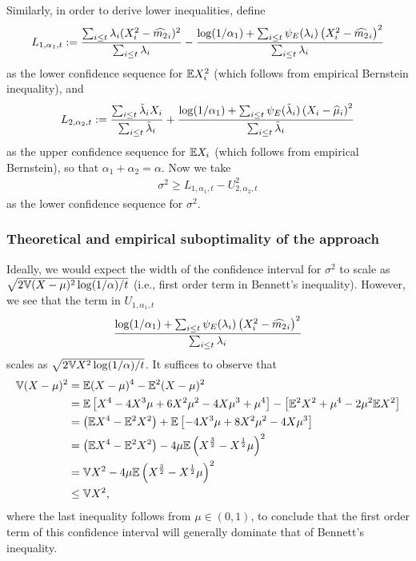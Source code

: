 Similarly, in order to derive lower inequalities, define
\begin{align*}
    L_{1, \alpha_1, t} :=  \frac{\sum_{i \leq t}\lambda_i (X_i^2 - \widehat {m_2}_i)^2}{\sum_{i \leq t} \lambda_i} - \frac{\log(1/\alpha_1) + \sum_{i \leq t}\psi_E(\lambda_i) \left( X_i ^2 - \widehat {m_2}_i \right)^2}{\sum_{i \leq t} \lambda_i} 
\end{align*}
as the lower confidence sequence for $\mathbb{E} X_i^2$ (which follows from empirical Bernstein inequality), and 
\begin{align*}
    L_{2, \alpha_2, t} :=   \frac{\sum_{i \leq t} \tilde \lambda_i X_i}{\sum_{i \leq t} \tilde \lambda_i} + \frac{\log(1/\alpha_1) + \sum_{i \leq t}\psi_E(\tilde\lambda_i) \left( X_i - \widehat \mu_i \right)^2}{\sum_{i \leq t} \tilde \lambda_i} 
\end{align*}
as the upper confidence sequence for $\mathbb{E} X_i$ (which follows from empirical Bernstein), so that $\alpha_1 + \alpha_2 = \alpha$. Now we take
\begin{align}
    \sigma^2 \geq L_{1, \alpha_1, t} - U^2_{2, \alpha_2, t}
\end{align}
as the lower confidence sequence for $\sigma^2$. 



\subsubsection{Theoretical and empirical suboptimality of the approach}

Ideally, we would expect the width of the confidence interval for $\sigma^2$ to scale as $ \sqrt{2\mathbb{V} (X-\mu)^2\log(1/\alpha)/t}$ (i.e., first order term in Bennett's inequality). However, we see that the term in $U_{1, \alpha_1, t}$
\begin{align*}
     \frac{\log(1/\alpha_1) + \sum_{i \leq t}\psi_E(\lambda_i) \left( X_i ^2 - \widehat {m_2}_i \right)^2}{\sum_{i \leq t} \lambda_i}
\end{align*}
scales as $ \sqrt{2\mathbb{V} X^2\log(1/\alpha)/t}$. It suffices to observe that
\begin{align*}
    \mathbb{V} (X-\mu)^2 &= \mathbb{E} (X-\mu)^4 - \mathbb{E}^2 (X-\mu)^2
    \\&= \mathbb{E} \left[ X^4 - 4X^3\mu + 6X^2\mu^2 - 4X\mu^3 + \mu^4 \right] - \left[ \mathbb{E}^2X^2 + \mu^4 - 2 \mu^2\mathbb{E} X^2  \right]
    \\&=\left(  \mathbb{E} X^4 - \mathbb{E}^2 X^2 \right) + \mathbb{E} \left[ - 4X^3\mu + 8X^2\mu^2 - 4X\mu^3  \right]
    \\&= \left(  \mathbb{E} X^4 - \mathbb{E}^2 X^2 \right) - 4\mu \mathbb{E} \left( X^{\frac{3}{2}} - X^{\frac{1}{2}}\mu \right)^2
    \\&= \mathbb{V} X^2 - 4\mu \mathbb{E} \left( X^{\frac{3}{2}} - X^{\frac{1}{2}}\mu \right)^2
    \\&\leq \mathbb{V} X^2,
\end{align*}
where the last inequality follows from $\mu \in (0,1)$, to conclude that the first order term of this confidence interval will generally dominate that of Bennett's inequality.

